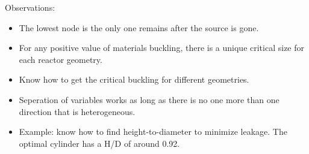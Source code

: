 \documentclass{school-22.211-notes}
\begin{document}
\clearpage
{}
\begin{table}[ht]
  \small
  \caption{One Group Fundamental Mode Eigenvalues and Eigenvectors} \label{eigen-values}
\end{table}
\normalsize

Observations:
\begin{itemize}
\item The lowest node is the only one remains after the source is gone. 
\item For any positive value of materials buckling, there is a unique critical size for each reactor geometry. 
\item Know how to get the critical buckling for different geometries. 
\item Seperation of variables works as long as there is no one more than one direction that is heterogeneous. 
\item Example: know how to find height-to-diameter to minimize leakage. The optimal cylinder has a H/D of around 0.92. 
\end{itemize}
 
  
\end{document}
